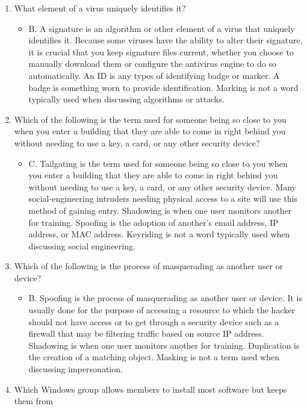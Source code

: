 \documentclass{article}
\begin{document}
\begin{enumerate}
\begin{itemize}
    \end{itemize}
    \item What element of a virus uniquely identifies it?
    \begin{itemize}
        \item B. A signature is an algorithm or other element of a virus that uniquely identifies it.
Because some viruses have the ability to alter their signature, it is crucial that you keep
signature files current, whether you choose to manually download them or configure the
antivirus engine to do so automatically. An ID is any types of identifying badge or marker.
A badge is something worn to provide identification. Marking is not a word typically used
when discussing algorithms or attacks.
    \end{itemize}
    \item Which of the following is the term used for someone being so close to you when you enter a
building that they are able to come in right behind you without needing to use a key, a card,
or any other security device?
    \begin{itemize}
        \item C. Tailgating is the term used for someone being so close to you when you enter a building
that they are able to come in right behind you without needing to use a key, a card, or any
other security device. Many social-engineering intruders needing physical access to a site
will use this method of gaining entry. Shadowing is when one user monitors another for
training. Spoofing is the adoption of another’s email address, IP address, or MAC address.
Keyriding is not a word typically used when discussing social engineering.
    \end{itemize}
    \item Which of the following is the process of masquerading as another user or device?
    \begin{itemize}
        \item B. Spoofing is the process of masquerading as another user or device. It is usually done for
the purpose of accessing a resource to which the hacker should not have access or to get
through a security device such as a firewall that may be filtering traffic based on source
IP address. Shadowing is when one user monitors another for training. Duplication is the
creation of a matching object. Masking is not a term used when discussing impersonation.
    \end{itemize}
    \item Which Windows group allows members to install most software but keeps them from

\end{enumerate}
\end{document}
